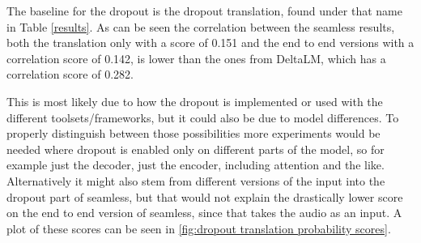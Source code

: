 The baseline for the dropout is the dropout translation, found under that name in Table \autoref{results}. As can be seen the correlation between the seamless results, both the translation only with a score of 0.151 and the end to end versions with a correlation score of 0.142, is lower than the ones from DeltaLM, which has a correlation score of 0.282.  

This is most likely due to how the dropout is implemented or used with the different toolsets/frameworks, but it could also be due to model differences. To properly distinguish between those possibilities more experiments would be needed where dropout is enabled only on different parts of the model, so for example just the decoder, just the encoder, including attention and the like. Alternatively it might also stem from different versions of the input into the dropout part of seamless, but that would not explain the drastically lower score on the end to end version of seamless, since that takes the audio as an input. 
A plot of these scores can be seen in \autoref{fig:dropout translation probability scores}.
